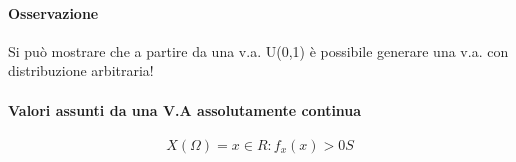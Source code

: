 \documentclass[12pt, a4paper, openany]{book}
\begin{document}
\paragraph*{Osservazione} Si può mostrare che a partire da una v.a. U(0,1) è possibile
generare una v.a. con distribuzione arbitraria!

\paragraph*{Valori assunti da una V.A assolutamente continua}
\begin{equation*}
    X(\Omega) = {x \in R: f_x(x) > 0S}
\end{equation*}
\end{document}
